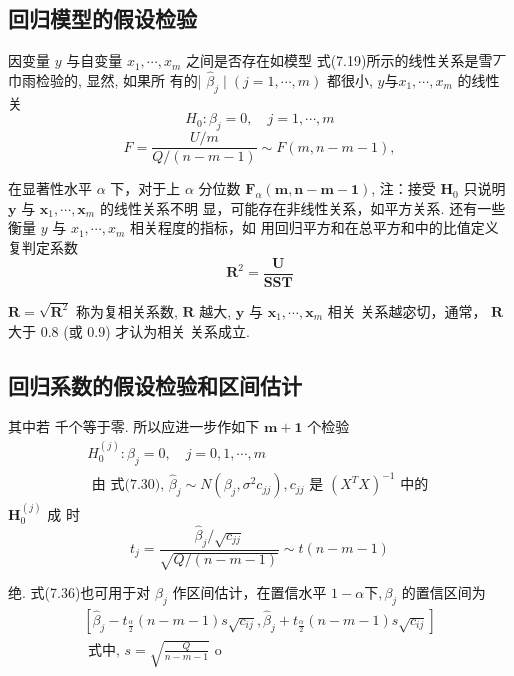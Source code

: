 \subsection{回归模型的假设检验}

因变量 \( y \) 与自变量 \( x_{1}, \cdots, x_{m} \) 之间是否存在如模型 式(7.19)所示的线性关系是雪丆巾雨检验的, 显然, 如果所 有的| \( \hat{\beta}_{j} \mid(j=1, \cdots, m) \) 都很小, \( y 与 x_{1}, \cdots, x_{m} \) 的线性关
$$
H_{0}: \beta_{j}=0, \quad j=1, \cdots, m
$$
$$
F=\frac{U / m}{Q /(n-m-1)} \sim F(m, n-m-1),
$$

在显著性水平 \( \alpha \) 下，对于上 \( \alpha \) 分位数 \( \boldsymbol{F}_{\alpha}(\boldsymbol{m}, \boldsymbol{n}-\boldsymbol{m}-\mathbf{1}) \),
注：接受 \( \boldsymbol{H}_{0} \) 只说明 \( \boldsymbol{y} \) 与 \( \boldsymbol{x}_{1}, \cdots, \boldsymbol{x}_{m} \) 的线性关系不明
显，可能存在非线性关系，如平方关系.  还有一些衡量 \( y \) 与 \( x_{1}, \cdots, x_{m} \) 相关程度的指标，如 用回归平方和在总平方和中的比值定义复判定系数
$$
\boldsymbol{R}^{2}=\frac{\boldsymbol{U}}{\boldsymbol{S S T}}
$$

\( \boldsymbol{R}=\sqrt{\boldsymbol{R}^{2}} \) 称为复相关系数, \( \boldsymbol{R} \) 越大, \( \boldsymbol{y} \) 与 \( \boldsymbol{x}_{1}, \cdots, \boldsymbol{x}_{m} \) 相关
关系越宓切，通常， \( \boldsymbol{R} \) 大于 \( 0.8 \) (或 0.9) 才认为相关
关系成立. 

\subsection{回归系数的假设检验和区间估计}

其中若 千个等于零. 所以应进一步作如下 \( \boldsymbol{m}+\mathbf{1} \) 个检验
$$
\begin{array}{l}
H_{0}^{(j)}: \beta_{j}=0, \quad j=0,1, \cdots, m \\
\text { 由 式(7.30), } \hat{\beta}_{j} \sim N\left(\beta_{j}, \sigma^{2} c_{j j}\right), c_{j j} \text { 是 }\left(X^{T} X\right)^{-1} \text { 中的 }
\end{array}
$$
\( \boldsymbol{H}_{0}^{(j)} \) 成 时
$$
t_{j}=\frac{\hat{\beta}_{j} / \sqrt{c_{j j}}}{\sqrt{Q /(n-m-1)}} \sim t(n-m-1)
$$

绝.  式(7.36)也可用于对 \( \beta_{j} \) 作区间估计，在置信水平 \( 1-\alpha 下, \beta_{j} \) 的置信区间为
$$
\begin{array}{l}
{\left[\hat{\beta}_{j}-t_{\frac{\alpha}{2}}(n-m-1) s \sqrt{c_{i j}}, \hat{\beta}_{j}+t_{\frac{\alpha}{2}}(n-m-1) s \sqrt{c_{i j}}\right]} \\
\text { 式中, } s=\sqrt{\frac{Q}{n-m-1}} \text { o }
\end{array}
$$

